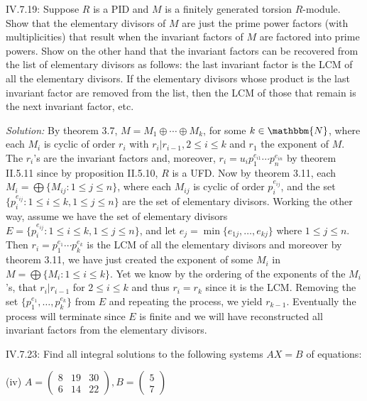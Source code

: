 \documentclass{letter}
\newcommand{\tmem}[1]{{\em #1\/}}
\begin{document}
IV.7.19: Suppose $R$ is a PID and $M$ is a finitely generated torsion
$R$-module. Show that the elementary divisors of $M$ are just the prime power
factors (with multiplicities) that result when the invariant factors of $M$
are factored into prime powers. Show on the other hand that the invariant
factors can be recovered from the list of elementary divisors as follows: the
last invariant factor is the LCM of all the elementary divisors. If the
elementary divisors whose product is the last invariant factor are removed
from the list, then the LCM of those that remain is the next invariant factor,
etc.

{\tmem{Solution:}} By theorem 3.7, $M = M_1 \oplus \cdots \oplus M_k$, for
some $k \in \mathbbm{N}$, where each $M_i$ is cyclic of order $r_i$ with $r_i
| r_{i - 1}, 2 \leq i \leq k$ and $r_1$ the exponent of $M$. The $r_i$'s are
the invariant factors and, moreover, $r_i = u_i p_1^{e_{i 1}} \cdots p_n^{e_{i
n}}$ by theorem II.5.11 since by proposition II.5.10, $R$ is a UFD. Now by
theorem 3.11, each $M_i = \bigoplus \{M_{i j} : 1 \leq j \leq n\}$, where each
$M_{i j}$ is cyclic of order $p_i^{e_{i j}}$, and the set $\{p_i^{e_{i j}} : 1
\leq i \leq k, 1 \leq j \leq n\}$ are the set of elementary divisors. Working
the other way, assume we have the set of elementary divisors $E =\{p_i^{e_{i
j}} : 1 \leq i \leq k, 1 \leq j \leq n\}$, and let $e_j = \min \{e_{1 j},
\ldots, e_{k j} \}$ where $1 \leq j \leq n$. Then $r_i = p_1^{e_1} \cdots
p_k^{e_k}$ is the LCM of all the elementary divisors and moreover by theorem
3.11, we have just created the exponent of some $M_i$ in $M = \bigoplus \{M_i
: 1 \leq i \leq k\}$. Yet we know by the ordering of the exponents of the
$M_i$'s, that $r_i | r_{i - 1}$ for $2 \leq i \leq k$ and thus $r_i = r_k$
since it is the LCM. Removing the set $\{p_1^{e_1}, \ldots, p_k^{e_k} \}$ from
$E$ and repeating the process, we yield $r_{k - 1}$. Eventually the process
will terminate since $E$ is finite and we will have reconstructed all
invariant factors from the elementary divisors.

IV.7.23: Find all integral solutions to the following systems $A X = B$ of
equations:

(iv) $A = \left(\begin{array}{ccc}
  8 & 19 & 30\\
  6 & 14 & 22
\end{array}\right), B = \left(\begin{array}{c}
  5\\
  7
\end{array}\right)$
\end{document}
